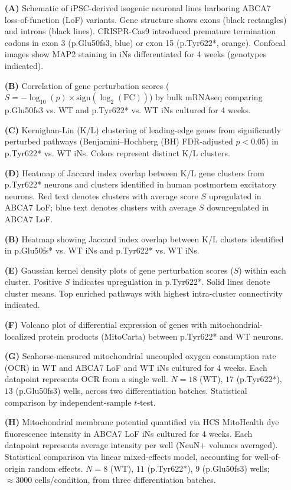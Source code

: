 \begin{itemize}
    \item[\textbf{(A)}] Schematic of iPSC-derived isogenic neuronal lines harboring ABCA7 loss-of-function (LoF) variants. Gene structure shows exons (black rectangles) and introns (black lines). CRISPR-Cas9 introduced premature termination codons in exon 3 (p.Glu50fs3, blue) or exon 15 (p.Tyr622*, orange). Confocal images show MAP2 staining in iNs differentiated for 4 weeks (genotypes indicated).
    \item[\textbf{(B)}] Correlation of gene perturbation scores ($S = -\log_{10}(p)\times\text{sign}(\log_2(\text{FC}))$) by bulk mRNAseq comparing p.Glu50fs3 vs. WT and p.Tyr622* vs. WT iNs cultured for 4 weeks.
    \item[\textbf{(C)}] Kernighan-Lin (K/L) clustering of leading-edge genes from significantly perturbed pathways (Benjamini–Hochberg (BH) FDR-adjusted $p<0.05$) in p.Tyr622* vs. WT iNs. Colors represent distinct K/L clusters.
    \item[\textbf{(D)}] Heatmap of Jaccard index overlap between K/L gene clusters from p.Tyr622* neurons and clusters identified in human postmortem excitatory neurons. Red text denotes clusters with average score $S$ upregulated in ABCA7 LoF; blue text denotes clusters with average $S$ downregulated in ABCA7 LoF.
    \item[\textbf{(B)}] Heatmap showing Jaccard index overlap between K/L clusters identified in p.Glu50fs* vs. WT iNs and p.Tyr622* vs. WT iNs.
    \item[\textbf{(E)}] Gaussian kernel density plots of gene perturbation scores ($S$) within each cluster. Positive $S$ indicates upregulation in p.Tyr622*. Solid lines denote cluster means. Top enriched pathways with highest intra-cluster connectivity indicated.
    \item[\textbf{(F)}] Volcano plot of differential expression of genes with mitochondrial-localized protein products (MitoCarta) between p.Tyr622* and WT neurons.
    \item[\textbf{(G)}] Seahorse-measured mitochondrial uncoupled oxygen consumption rate (OCR) in WT and ABCA7 LoF and WT iNs cultured for 4 weeks. Each datapoint represents OCR from a single well. $N=18$ (WT), $17$ (p.Tyr622*), $13$ (p.Glu50fs3) wells, across two differentiation batches. Statistical comparison by independent-sample $t$-test.
    \item[\textbf{(H)}] Mitochondrial membrane potential quantified via HCS MitoHealth dye fluorescence intensity in ABCA7 LoF iNs cultured for 4 weeks. Each datapoint represents average intensity per well (NeuN+ volumes averaged). Statistical comparison via linear mixed-effects model, accounting for well-of-origin random effects. $N=8$ (WT), $11$ (p.Tyr622*), $9$ (p.Glu50fs3) wells; $\approx3000$ cells/condition, from three differentiation batches.

\end{itemize}
